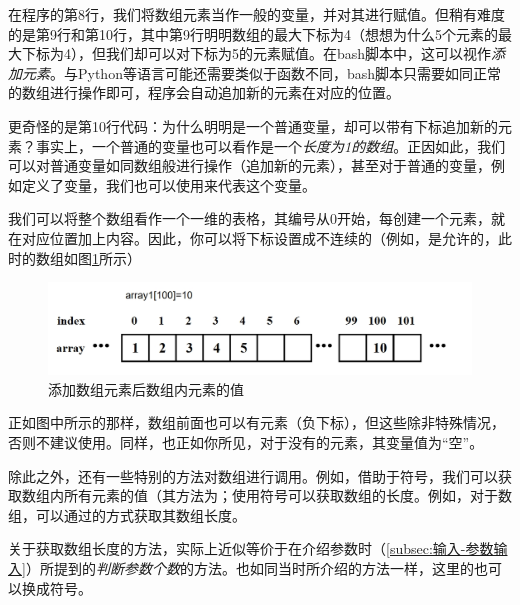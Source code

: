 在程序的第8行，我们将数组元素当作一般的变量，并对其进行赋值。但稍有难度的是第9行和第10行，其中第9行明明数组的最大下标为4（想想为什么5个元素的最大下标为4），但我们却可以对下标为5的元素赋值。在bash脚本中，这可以视作\emph{添加元素}。与Python等语言可能还需要类似于函数不同，bash脚本只需要如同正常的数组进行操作即可，程序会自动追加新的元素在对应的位置。

更奇怪的是第10行代码：为什么明明是一个普通变量，却可以带有下标追加新的元素？事实上，一个普通的变量也可以看作是一个\emph{长度为1的数组}。正因如此，我们可以对普通变量如同数组般进行操作（追加新的元素），甚至对于普通的变量，例如定义了变量，我们也可以使用来代表这个变量。

\begin{extend}
    我们可以将整个数组看作一个一维的表格，其编号从0开始，每创建一个元素，就在对应位置加上内容。因此，你可以将下标设置成不连续的（例如，是允许的，此时的数组如图\ref{fig:数组-添加数组元素后数组内元素的值}所示）

    \begin{figure}
        \centering
        \includegraphics[width=1\linewidth]{Linux基础/Shell脚本基础/数组/fig/数组结构.png}
        \caption{添加数组元素后数组内元素的值}
        \label{fig:数组-添加数组元素后数组内元素的值}
    \end{figure}

    正如图中所示的那样，数组前面也可以有元素（负下标），但这些除非特殊情况，否则不建议使用。同样，也正如你所见，对于没有的元素，其变量值为“空”。
\end{extend}

除此之外，还有一些特别的方法对数组进行调用。例如，借助于\code{*}符号，我们可以获取数组内所有元素的值（其方法为；使用\code{\#}符号可以获取数组的长度。例如，对于数组，可以通过的方式获取其数组长度。

\begin{extend}
    关于获取数组长度的方法，实际上近似等价于在介绍参数时（\ref{subsec:输入-参数输入}）所提到的\emph{判断参数个数}的方法。也如同当时所介绍的方法一样，这里的\code{*}也可以换成\code{\@}符号。
\end{extend}

